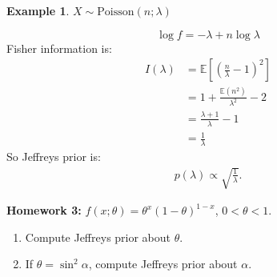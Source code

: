 \documentclass[11pt]{article}
\def\BE{{\mathbb E}}
\newtheorem{example}{Example}[section]
\begin{document}
\begin{example}
$X \sim \mbox{Poisson}(n;\lambda)$
\end{example}
$$
\log f = -\lambda + n\log\lambda
$$
Fisher information is:
\[\begin{split}
I(\lambda) &= \BE\left[ \left( \frac{n}{\lambda} - 1\right)^2 \right] \\
&= 1 + \frac{\BE(n^2)}{\lambda^2} - 2 \\
&= \frac{\lambda + 1}{\lambda} - 1 \\
&= \frac{1}{\lambda}
\end{split}\]
So Jeffreys prior is:
\[\begin{split}
p(\lambda) \propto \sqrt{\frac{1}{\lambda}}.
\end{split}\]
 
\textbf{Homework 3:} $f(x; \theta) = \theta^x(1-\theta)^{1-x}$, $0 < \theta < 1$.
\begin{enumerate}
\item Compute Jeffreys prior about $\theta$.
\item If $\theta = \sin^2 \alpha$, compute Jeffreys prior about $\alpha$.
\end{enumerate}
 
\end{document}
